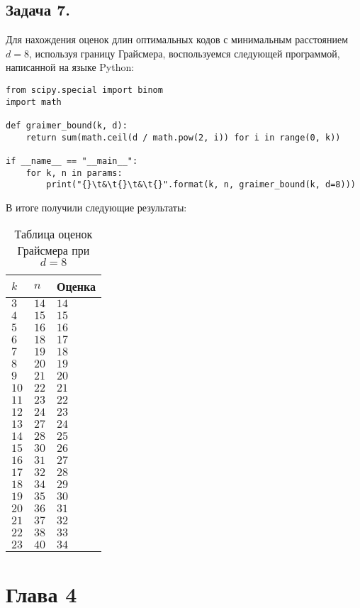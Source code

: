 \documentclass{article}
\begin{document}
\subsection{Задача 7.}
Для нахождения оценок длин оптимальных кодов с минимальным расстоянием $d=8$, используя границу Грайсмера, воспользуемся следующей программой, написанной на языке Python:
%
\begin{lstlisting}[frame=single]
from scipy.special import binom
import math

def graimer_bound(k, d):
    return sum(math.ceil(d / math.pow(2, i)) for i in range(0, k))

if __name__ == "__main__":
    for k, n in params:
        print("{}\t&\t{}\t&\t{}".format(k, n, graimer_bound(k, d=8)))
\end{lstlisting}
%
В итоге получили следующие результаты:
%
\begin{table}[H]
\centering
\caption{Таблица оценок Грайсмера при $d=8$}
\begin{tabular}{|l|l|l|}
\hline
$k$     &   $n$     &   Оценка \\ \hline
$3$ 	&	$14$	&	$14$ \\
$4$	    &	$15$	&	$15$ \\
$5$	    &	$16$	&	$16$ \\
$6$ 	&	$18$	&	$17$ \\
$7$ 	&	$19$	&	$18$ \\
$8$ 	&	$20$	&	$19$ \\
$9$ 	&	$21$	&	$20$ \\
$10$	&	$22$	&	$21$ \\
$11$	&	$23$	&	$22$ \\
$12$	&	$24$	&	$23$ \\
$13$	&	$27$	&	$24$ \\
$14$	&	$28$	&	$25$ \\
$15$	&	$30$	&	$26$ \\
$16$	&	$31$	&	$27$ \\
$17$	&	$32$	&	$28$ \\
$18$	&	$34$	&	$29$ \\
$19$	&	$35$	&	$30$ \\
$20$	&	$36$	&	$31$ \\
$21$	&	$37$	&	$32$ \\
$22$	&	$38$	&	$33$ \\
$23$	&	$40$	&	$34$ \\
\hline
\end{tabular}
\end{table}
%

\section{Глава 4}
%
\end{document}
